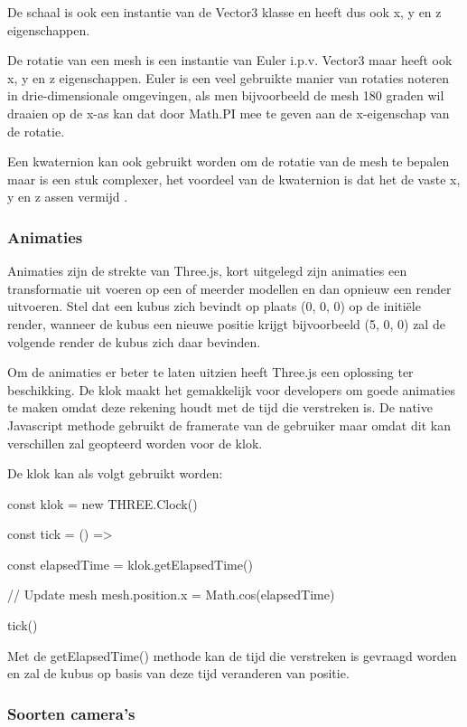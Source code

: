 De schaal is ook een instantie van de Vector3 klasse en heeft dus ook x, y en z eigenschappen.

De rotatie van een mesh is een instantie van Euler i.p.v. Vector3 maar heeft ook x, y en z eigenschappen. Euler is een veel gebruikte manier van rotaties noteren in drie-dimensionale omgevingen, als men bijvoorbeeld de mesh 180 graden wil draaien op de x-as kan dat door Math.PI mee te geven aan de x-eigenschap van de rotatie.

Een kwaternion kan ook gebruikt worden om de rotatie van de mesh te bepalen maar is een stuk complexer, het voordeel van de kwaternion is dat het de vaste x, y en z assen vermijd \autocite{Simon2023}.

\subsubsection{Animaties}

Animaties zijn de strekte van Three.js, kort uitgelegd zijn animaties een transformatie uit voeren op een of meerder modellen en dan opnieuw een render uitvoeren. Stel dat een kubus zich bevindt op plaats (0, 0, 0) op de initiële render, wanneer de kubus een nieuwe positie krijgt bijvoorbeeld (5, 0, 0) zal de volgende render de kubus zich daar bevinden. 

Om de animaties er beter te laten uitzien heeft Three.js een oplossing ter beschikking. De klok maakt het gemakkelijk voor developers om goede animaties te maken omdat deze rekening houdt met de tijd die verstreken is. De native Javascript methode gebruikt de framerate van de gebruiker maar omdat dit kan verschillen zal geopteerd worden voor de klok.

De klok kan als volgt gebruikt worden:

\begin{LVerbatim}
const klok = new THREE.Clock()

const tick = () =>
{
	const elapsedTime = klok.getElapsedTime()
	
	// Update mesh
	mesh.position.x = Math.cos(elapsedTime)
}

tick()
\end{LVerbatim}

Met de getElapsedTime() methode kan de tijd die verstreken is gevraagd worden en zal de kubus op basis van deze tijd veranderen van positie. 

\subsubsection{Soorten camera's}

